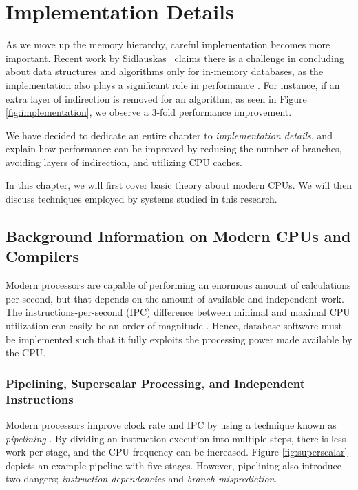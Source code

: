 \chapter{Implementation Details}
\label{chap:Implementation Details}

As we move up the memory hierarchy, careful implementation becomes more important. Recent work by Sidlauskas \ea~claims there is a challenge in concluding about data structures and algorithms only for in-memory databases, as the implementation also plays a significant role in performance \cite{Sidlauskas2014-ef}. For instance, if an extra layer of indirection is removed for an algorithm, as seen in Figure \ref{fig:implementation}, we observe a 3-fold performance improvement. 

We have decided to dedicate an entire chapter to \textit{implementation details}, and explain how performance can be improved by reducing the number of branches, avoiding layers of indirection, and utilizing CPU caches.

In this chapter, we will first cover basic theory about modern CPUs. We will then discuss techniques employed by systems studied in this research.

\newpage

\section{Background Information on Modern CPUs and Compilers}
\label{sec:Background Information on Modern CPUs and Compilers}
Modern processors are capable of performing an enormous amount of calculations per second, but that depends on the amount of available and independent work. The instructions-per-second (IPC) difference between minimal and maximal CPU utilization can easily be an order of magnitude \cite{Boncz2005-wj}. Hence, database software must be implemented such that it fully exploits the processing power made available by the CPU.

\subsection{Pipelining, Superscalar Processing, and Independent Instructions}
\label{sub:Pipelining, Superscalar Processing, and Independent Instructions}
Modern processors improve clock rate and IPC by using a technique known as \textit{pipelining} \cite{Boncz2005-wj}. By dividing an instruction execution into multiple steps, there is less work per stage, and the CPU frequency can be increased. Figure \ref{fig:superscalar} depicts an example pipeline with five stages. However, pipelining also introduce two dangers; \textit{instruction dependencies} and \textit{branch misprediction}.

